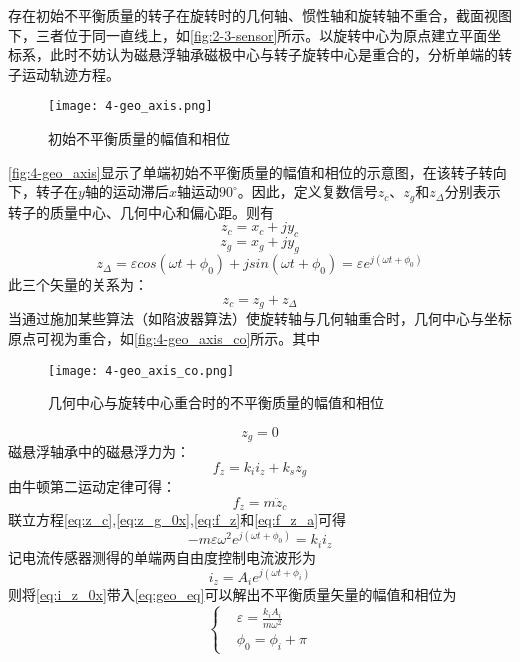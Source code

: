 存在初始不平衡质量的转子在旋转时的几何轴、惯性轴和旋转轴不重合，截面视图下，三者位于同一直线上，如\autoref{fig:2-3-sensor}所示。以旋转中心为原点建立平面坐标系，此时不妨认为磁悬浮轴承磁极中心与转子旋转中心是重合的，分析单端的转子运动轨迹方程。
\begin{figure}
	\texttt{[image: 4-geo\_axis.png]}
	\caption{初始不平衡质量的幅值和相位}
	\label{fig:4-geo_axis}
\end{figure}
\autoref{fig:4-geo_axis}显示了单端初始不平衡质量的幅值和相位的示意图，在该转子转向下，转子在$y$轴的运动滞后$x$轴运动$90^{\circ}$。因此，定义复数信号$z_c$、$z_g$和$z_{\Delta}$分别表示转子的质量中心、几何中心和偏心距。则有
\begin{equation}
z_c = x_c + jy_c
\end{equation}
\begin{equation}
z_g = x_g + jy_g
\end{equation}
\begin{equation}
\label{eq:z_delta}
z_{\Delta} = \varepsilon cos(\omega t+\phi _0) + jsin(\omega t + \phi _0) = \varepsilon e^{j(\omega t + \phi _0)}
\end{equation}
此三个矢量的关系为：
\begin{equation}
	\label{eq:z_c}
	z_c = z_g + z_{\Delta}
\end{equation}
当通过施加某些算法（如陷波器算法）使旋转轴与几何轴重合时，几何中心与坐标原点可视为重合，如\autoref{fig:4-geo_axis_co}所示。其中
\begin{figure}
	\texttt{[image: 4-geo\_axis\_co.png]}
	\caption{几何中心与旋转中心重合时的不平衡质量的幅值和相位}
	\label{fig:4-geo_axis_co}
\end{figure}
\begin{equation}
	\label{eq:z_g_0x}
	z_g = 0
\end{equation}
磁悬浮轴承中的磁悬浮力为：
\begin{equation}
	\label{eq:f_z}
	f_z = k_ii_z + k_sz_g
\end{equation}
由牛顿第二运动定律可得：
\begin{equation}
	\label{eq:f_z_a}
	f_z = m{\ddot{z}}_c
\end{equation}
联立方程\autoref{eq:z_c},\autoref{eq:z_g_0x},\autoref{eq:f_z}和\autoref{eq:f_z_a}可得
\begin{equation}
	\label{eq:geo_eq}
	-m\varepsilon {\omega}^2e^{j(\omega t + \phi _0)} = k_ii_z
\end{equation}
记电流传感器测得的单端两自由度控制电流波形为
\begin{equation}
	\label{eq:i_z_0x}
	i_z = A_ie^{j(\omega t + \phi _i)}
\end{equation}
则将\autoref{eq:i_z_0x}带入\autoref{eq:geo_eq}可以解出不平衡质量矢量的幅值和相位为
\begin{equation}
\left\{
\begin{aligned}
& \varepsilon = \frac{k_iA_i}{m{\omega}^2}\\
& \phi _0 = \phi _i + \pi
\end{aligned}
\right.
\end{equation}


